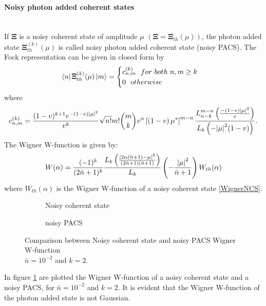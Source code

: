         \paragraph{Noisy photon added coherent states}\mbox{}\\
        If $\pmb{\Xi}$ is a noisy coherent state of amplitude $\mu$ $(\pmb{\Xi}=\pmb{\Xi}_{th}(\mu))$,
        the photon added state $\pmb{\Xi}_{th}^{(k)}(\mu)$ is called noisy photon added coherent state
        (noisy PACS).
        The Fock representation can be given in closed form by \cite{PACSDisc}
        \begin{equation}
            \bra{n}\pmb{\Xi}_{th}^{(k)}(\mu)\ket{m}=
            \begin{cases}
                c_{n,m}^{(k)}\ \ for\ both\ n,m \geq k\\
                0\ \ otherwise
            \end{cases}
        \end{equation}
        where
        \begin{equation*}
            c_{n,m}^{(k)}=\frac{(1-v)^{k+1}e^{-(1-v)\absolutevalue{\mu}^2}}{v^k}
            \sqrt{n!}{m!}\binom{m}{k} v^n \left[\left(1-v\right)\mu^*\right]^{m-n}
            \frac{L^{m-n}_{n-k} \left( \frac{-(1-v)\absolutevalue{\mu}^2}{v} \right)}
            {L_k \left( -\absolutevalue{\mu}^2 (1-v) \right)}.
        \end{equation*}
        The Wigner W-function is given by:
        \begin{equation}
            W(\alpha)=\frac{(-1)^k}{(2\bar{n}+1)^k}\frac{L_k \left( 
                \frac{\absolutevalue{2\alpha(\bar{n}+1)-\mu}^2}{(2\bar{n}+1)(\bar{n}+1)} \right)}
                {L_k} \left(-\frac{\absolutevalue{\mu}^2}{\bar{n}+1} \right) W_{th}(\alpha)
        \end{equation}
        where $W_{th}(\alpha)$ is the Wigner W-function of a noisy coherent state \ref{WignerNCS}.
        \begin{figure}[tbp]
            \begin{center}
            \begin{subfigure}{0.5\textwidth}
                
                \caption{Noisy coherent state}
            \end{subfigure}
            \begin{subfigure}{0.5\textwidth}
                
                \caption{noisy PACS}
            \end{subfigure}
            \caption{Comparison between Noisy coherent state and noisy PACS Wigner W-function\\
            $\bar{n}=10^{-2}$ and $k=2$.}
            \label{fig:WignerPACS}
            \end{center}
        \end{figure}
        In figure \ref{fig:WignerPACS} are plotted the Wigner W-function of a noisy coherent
        state and a noisy PACS, for $\bar{n}=10^{-2}$ and $k=2$. It is evident that the Wigner 
        W-function of the photon added state is not Gaussian.
        
